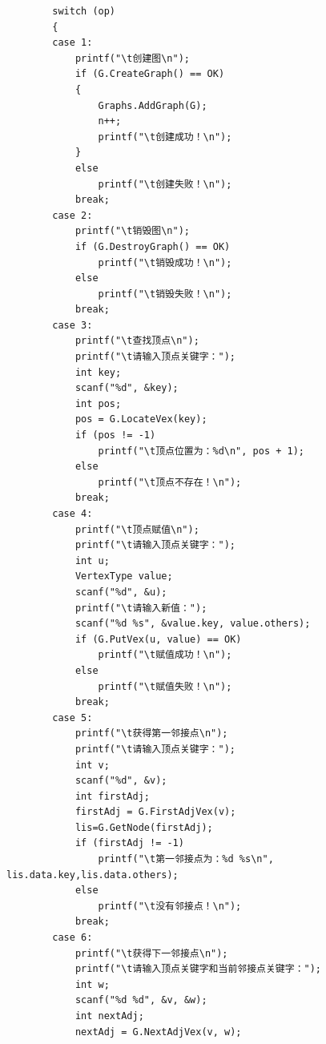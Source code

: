 \documentclass[supercite]{Experimental_Report}
\theoremstyle{definition}
\begin{document}
\begin{lstlisting}
        switch (op)
        {
        case 1:
            printf("\t创建图\n");
            if (G.CreateGraph() == OK)
            {
                Graphs.AddGraph(G);
                n++;
                printf("\t创建成功！\n");
            }
            else
                printf("\t创建失败！\n");
            break;
        case 2:
            printf("\t销毁图\n");
            if (G.DestroyGraph() == OK)
                printf("\t销毁成功！\n");
            else
                printf("\t销毁失败！\n");
            break;
        case 3:
            printf("\t查找顶点\n");
            printf("\t请输入顶点关键字：");
            int key;
            scanf("%d", &key);
            int pos;
            pos = G.LocateVex(key);
            if (pos != -1)
                printf("\t顶点位置为：%d\n", pos + 1);
            else
                printf("\t顶点不存在！\n");
            break;
        case 4:
            printf("\t顶点赋值\n");
            printf("\t请输入顶点关键字：");
            int u;
            VertexType value;
            scanf("%d", &u);
            printf("\t请输入新值：");
            scanf("%d %s", &value.key, value.others);
            if (G.PutVex(u, value) == OK)
                printf("\t赋值成功！\n");
            else
                printf("\t赋值失败！\n");
            break;
        case 5:
            printf("\t获得第一邻接点\n");
            printf("\t请输入顶点关键字：");
            int v;
            scanf("%d", &v);
            int firstAdj;
            firstAdj = G.FirstAdjVex(v);
            lis=G.GetNode(firstAdj);
            if (firstAdj != -1)
                printf("\t第一邻接点为：%d %s\n", lis.data.key,lis.data.others);
            else
                printf("\t没有邻接点！\n");
            break;
        case 6:
            printf("\t获得下一邻接点\n");
            printf("\t请输入顶点关键字和当前邻接点关键字：");
            int w;
            scanf("%d %d", &v, &w);
            int nextAdj;
            nextAdj = G.NextAdjVex(v, w);


\end{lstlisting}
\end{document}
